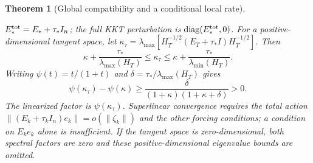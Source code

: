 \documentclass[pdflatex,sn-mathphys-num]{sn-jnl}
\theoremstyle{thmstyleone}
\newtheorem{theorem}{Theorem}[section]
\theoremstyle{thmstylethree}
\begin{document}
\begin{theorem}[Global compatibility and a conditional local rate]
\begin{enumerate}[label=(\roman*),leftmargin=2.6em]
$E_*^{\rm tot}=E_*+\tau_*I_n$; the full KKT perturbation is
$\operatorname{diag}(E_*^{\rm tot},0)$.
For a positive-dimensional tangent space, let
$\kappa_\tau=\lambda_{\max}
 [H_T^{-1/2}(E_T+\tau_*I)H_T^{-1/2}]$.
Then
\[
 \kappa+\frac{\tau_*}{\lambda_{\max}(H_T)}
 \leq\kappa_\tau\leq
 \kappa+\frac{\tau_*}{\lambda_{\min}(H_T)}.
\]
Writing $\psi(t)=t/(1+t)$ and
$\delta=\tau_*/\lambda_{\max}(H_T)$ gives
\[
 \psi(\kappa_\tau)-\psi(\kappa)
 \geq\frac{\delta}{(1+\kappa)(1+\kappa+\delta)}>0.
\]
The linearized factor is $\psi(\kappa_\tau)$.
Superlinear convergence requires the total action
$\|(E_k+\tau_kI_n)e_k\|=o(\|\zeta_k\|)$ and the other forcing
conditions; a condition on $E_ke_k$ alone is insufficient.
If the tangent space is zero-dimensional, both spectral factors
are zero and these positive-dimensional eigenvalue bounds are omitted.
\end{enumerate}
\end{theorem}
\end{document}
